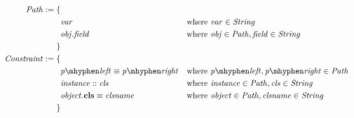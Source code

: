 \begin{figure}[t]
\begin{subfigure}[c]{1\textwidth}
\centering
%
\begin{align*}
\mIt{Path} := \{\\
  &\mIt{var} &&\text{where } \mIt{var}\in \mIt{String}\\
  &\mIt{obj.field} &&\text{where } \mIt{obj} \in \mIt{Path}, \mIt{field} \in \mIt{String}\\ \}\\
\mIt{Constraint} := \{\\
  &\pathEq{\pleft}{\pright} &&\text{where } \pleft,\pright \in \mIt{Path}\\
  &\instOf{instance}{cls} &&\text{where } \mIt{instance} \in \mIt{Path}, \mIt{cls} \in \mIt{String}\\
  &\instBy{object}{clsname} &&\text{where } \mIt{object} \in \mIt{Path}, \mIt{clsname} \in \mIt{String}\\ \}
\end{align*}
%

\end{subfigure}
\end{figure}
